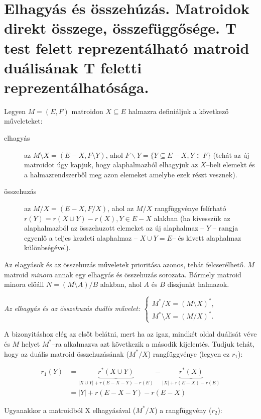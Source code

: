 
\newpage
\section{Elhagyás és összehúzás. Matroidok direkt összege, összefüggősége. T test felett
reprezentálható matroid duálisának T feletti reprezentálhatósága.}

Legyen $M=(E,F)$ matroidon $X \subseteq E$ halmazra definiáljuk a következő
műveleteket:
\begin{description}
  \item[elhagyás] az $M \setminus X=(E-X, F \setminus Y)$, ahol $F \backslash
  Y=\{Y\subseteq E-X, Y \in F\}$ (tehát az új matroidot úgy kapjuk, hogy
  alaphalmazból elhagyjuk az $X$--beli elemekt és a halmazrendszerből meg azon
  elemeket amelybe ezek részt vesznek).
  \item[összehuzás]  az $M / X=(E-X, F / X)$, ahol az $M/X$ rangfüggvénye felírható
  $r(Y)=r(X \cup Y) - r(X), Y \in  E-X$ alakban (ha kivesszük az alaphalmazból az
  összehuzott elemeket az új alaphalmaz -- $Y$ -- rangja egyenlő a teljes kezdeti alaphalmaz 
  -- $X \cup Y = E$-- és kivett alaphalmaz különbségével).
\end{description}

Az elagyások és az összehuzás műveletek prioritása azonos, tehát felcserélhető. $M$ matroid 
\emph{minora} annak egy elhagyás és összehuzás sorozata. Bármely matroid minora előáll
$N=(M \setminus A) / B$ alakban, ahol $A$ és $B$ diszjunkt halmazok.

\emph{Az elhagyás és az összehuzás duális művelet: $\begin{cases}
M^*/X=(M \setminus X)^*, \\
M^* \setminus X = (M / X)^*.
\end{cases}$}

A bizonyitáshoz elég az elsőt belátni, mert ha az igaz, mindkét oldal duálisát
véve és $M$ helyet $M^*$--ra alkalmazva azt következik a második kijelentés.
Tudjuk tehát, hogy az duális matroid összehuzásának ($M^*/X$) rangfüggvénye
(legyen ez $r_1$):

\begin{align*}
r_1(Y) &=\underbrace{r^*(X \cup Y)}_{|X \cup Y| + r(E-X-Y) - r(E)} - 
		 \underbrace{r^*(X)}_{|X| + r(E-X) - r(E)} \\
	   &= |Y| + r(E-X-Y) - r(E-X) 
\end{align*}

Ugyanakkor a matroidból X elhagyásával ($M^*/X$) a rangfüggvény ($r_2$):


